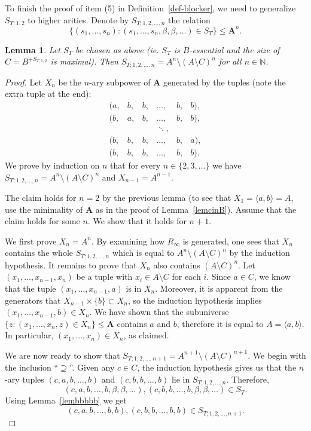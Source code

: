 \documentclass{amsart}
\theoremstyle{plain}
\newtheorem{lemma}[theorem]{Lemma}
\theoremstyle{definition}
\begin{document}
To finish the proof of item (5) in Definition~\ref{def-blocker}, we need to generalize $S_{T;1,2}$ to higher arities. 
Denote by $S_{T;1,2,\dots,n}$ the relation
\[
  \{(s_1,\dots,s_n) \colon (s_1,\dots,s_n,\beta,\beta,\dots)\in S_T\} \leq {{\mathbf{A}}}^n.
\]
\begin{lemma}\label{lemGeneralblocker}
  Let $S_T$ be
  chosen as above (ie. $S_T$ is $B$-essential and the size of
  $C=B^{+S_{T;1,2}}$ is maximal). Then
  $S_{T;1,2,\dots,n}=A^n\setminus(A\setminus C)^n$ for all $n \in{{\mathbb N}}$.
\end{lemma}
\begin{proof}
  Let $X_n$ be the $n$-ary subpower of ${{\mathbf{A}}}$ generated by the tuples (note the extra
  tuple at the end):
\[
  \begin{matrix}
    (a,&b,&b,&\dots,&b,&b),\\
    (b,&a,&b,&\dots,&b,&b),\\
    &&&\ddots,\\
    (b,&b,&b,&\dots,&b,&a),\\
    (b,&b,&b,&\dots,&b,&b).
  \end{matrix}
\]
 We prove by induction on $n$ that for every $n\in\{2,3,\dots\}$ we have $S_{T;1,2,\dots,n}=A^n\setminus
(A\setminus C)^n$ and $X_{n-1}=A^{n-1}$.

The claim holds for $n=2$ by the previous lemma (to see that $X_1=\langle a,b\rangle=A$,
use the minimality of ${{\mathbf{A}}}$ as in the proof of Lemma~\ref{lemcinB}). Assume that the claim holds for some $n$. We show
that it holds for $n+1$.

We first prove $X_n=A^n$. By examining how $R_\infty$ is generated, one sees that
$X_n$ contains the whole $S_{T;1,2,\dots,n}$ which is equal to $A^n\setminus(A\setminus C)^n$ by the induction hypothesis. It
remains to prove that $X_n$ also contains $(A\setminus C)^n$.  Let
$(x_1,\dots,x_{n-1},x_n)$ be a tuple with $x_i\in A\setminus C$ for each $i$.
Since $a\in C$, we know that the tuple $(x_1,\dots,x_{n-1},a)$ is in $X_n$.
Moreover, it is apparent from the generators  
that $X_{n-1}\times \{b\}\subset X_n$, so the induction hypothesis implies $(x_1,\dots,x_{n-1},b)\in X_n$. 
We have shown that the subuniverse $\{z \colon (x_1, \dots, x_n,z) \in X_n\} \leq {{\mathbf{A}}}$ contains $a$ and $b$, therefore it is equal to $A = \langle a,b \rangle$. In particular, $(x_1, \dots, x_n) \in X_n$, as claimed. 

We are now ready to show that $S_{T;1,2,\dots,n+1}=A^{n+1}\setminus(A\setminus
C)^{n+1}$. We begin with the inclusion ``$\supseteq$''.  
Given any $c\in C$, the induction hypothesis gives us that the $n$-ary tuples
$(c,a,b,\dots,b)$ and $(c,b,b,\dots,b)$ lie in $S_{T;1,2,\dots,n}$.
Therefore,
\[
  (c,a,b,\dots,b,\beta,\beta,\dots), (c,b,b,\dots,b,\beta, \beta, \dots )\in S_T.
\]
Using Lemma~\ref{lembbbbb} we get
\[
  (c,a,b,\dots,b,b),(c,b,b,\dots,b,b)\in S_{T;1,2,\dots,n+1}.
\]


\end{proof}
\end{document}
